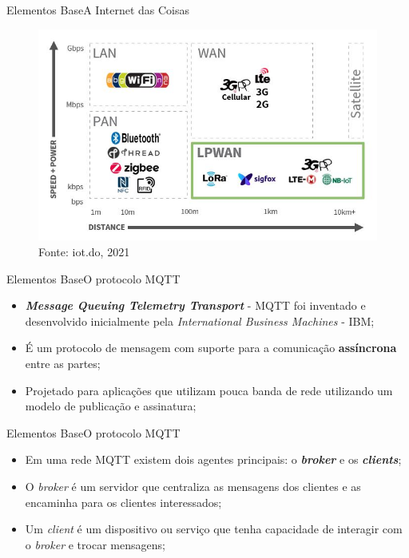 \begin{frame}{Elementos Base}{A Internet das Coisas}

    \begin{figure}
        \centering
        \caption{Protocolos utilizados para aplicacão do \textit{IoT} com base nos conceitos de redes. Relação entre velocidade-força e distância.}
        \includegraphics[width=0.6\linewidth]{figuras/iotprotocols.jpg}
        \caption*{\tiny{Fonte: iot.do, 2021}}
    \end{figure}   

\end{frame}


\begin{frame}{Elementos Base}{O protocolo MQTT}

    \begin{itemize}
        \item \textbf{\textit{Message Queuing Telemetry Transport}} - MQTT foi inventado e desenvolvido inicialmente pela \textit{International Business Machines} - IBM;
        \item É um protocolo de mensagem com suporte para a comunicação \textbf{assíncrona} entre as partes;
        \item Projetado para aplicações que utilizam pouca banda de rede utilizando um modelo de publicação e assinatura;

    \end{itemize}


\end{frame}

\begin{frame}{Elementos Base}{O protocolo MQTT}

    \begin{itemize}
        \item Em uma rede MQTT existem dois agentes principais: o \textit{\textbf{broker}} e os \textit{\textbf{clients}};
        \item O \textit{broker} é um servidor que centraliza as mensagens dos clientes e as encaminha para os clientes interessados;
        \item Um \textit{client} é um dispositivo ou serviço que tenha capacidade de interagir com o \textit{broker} e trocar mensagens;

    \end{itemize}


\end{frame}

